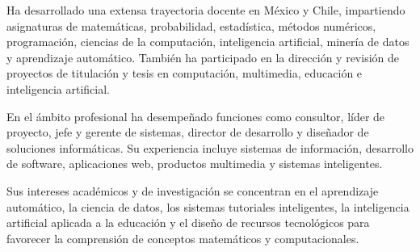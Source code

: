 \documentclass[
  spanish,
  10.5pt,
  letterpaper,
  DIV=11,
  numbers=noendperiod,
  oneside,
  open=any]{scrreprt}
\theoremstyle{definition}
\theoremstyle{definition}
\theoremstyle{plain}
\theoremstyle{remark}
\begin{document}
Ha desarrollado una extensa trayectoria docente en México y Chile,
impartiendo asignaturas de matemáticas, probabilidad, estadística,
métodos numéricos, programación, ciencias de la computación,
inteligencia artificial, minería de datos y aprendizaje automático.
También ha participado en la dirección y revisión de proyectos de
titulación y tesis en computación, multimedia, educación e inteligencia
artificial.

En el ámbito profesional ha desempeñado funciones como consultor, líder
de proyecto, jefe y gerente de sistemas, director de desarrollo y
diseñador de soluciones informáticas. Su experiencia incluye sistemas de
información, desarrollo de software, aplicaciones web, productos
multimedia y sistemas inteligentes.

Sus intereses académicos y de investigación se concentran en el
aprendizaje automático, la ciencia de datos, los sistemas tutoriales
inteligentes, la inteligencia artificial aplicada a la educación y el
diseño de recursos tecnológicos para favorecer la comprensión de
conceptos matemáticos y computacionales.
\end{document}
